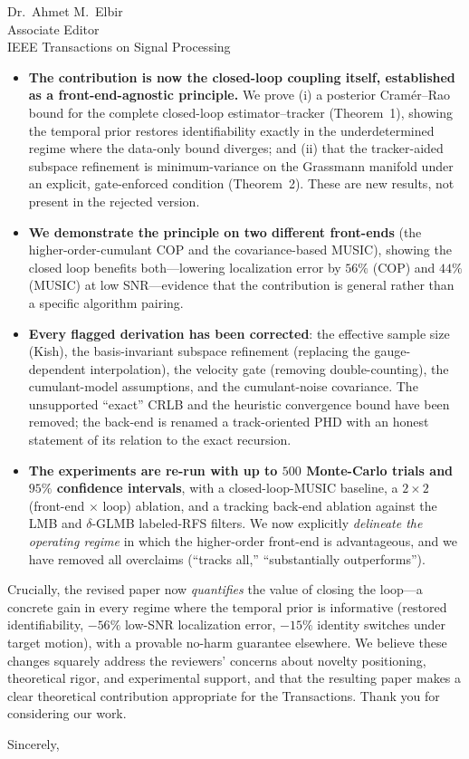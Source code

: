 \documentclass[11pt]{letter}
\begin{document}
\begin{letter}{Dr.\ Ahmet M.\ Elbir \\ Associate Editor \\ IEEE Transactions on Signal Processing}
\begin{itemize}
\item \textbf{The contribution is now the closed-loop coupling itself,
  established as a front-end-agnostic principle.} We prove (i) a posterior
  Cram\'er--Rao bound for the complete closed-loop estimator--tracker
  (Theorem~1), showing the temporal prior restores identifiability exactly in
  the underdetermined regime where the data-only bound diverges; and (ii) that
  the tracker-aided subspace refinement is minimum-variance on the Grassmann
  manifold under an explicit, gate-enforced condition (Theorem~2). These are new
  results, not present in the rejected version.
\item \textbf{We demonstrate the principle on two different front-ends} (the
  higher-order-cumulant COP and the covariance-based MUSIC), showing the closed
  loop benefits both---lowering localization error by $56\%$ (COP) and $44\%$
  (MUSIC) at low SNR---evidence that the contribution is general rather than a
  specific algorithm pairing.
\item \textbf{Every flagged derivation has been corrected}: the effective sample
  size (Kish), the basis-invariant subspace refinement (replacing the
  gauge-dependent interpolation), the velocity gate (removing double-counting),
  the cumulant-model assumptions, and the cumulant-noise covariance. The
  unsupported ``exact'' CRLB and the heuristic convergence bound have been
  removed; the back-end is renamed a track-oriented PHD with an honest statement
  of its relation to the exact recursion.
\item \textbf{The experiments are re-run with up to $500$ Monte-Carlo trials and
  $95\%$ confidence intervals}, with a closed-loop-MUSIC baseline, a
  $2\times2$ (front-end $\times$ loop) ablation, and a tracking back-end ablation
  against the LMB and $\delta$-GLMB labeled-RFS filters. We now explicitly \emph{delineate the operating regime}
  in which the higher-order front-end is advantageous, and we have removed all
  overclaims (``tracks all,'' ``substantially outperforms'').
\end{itemize}

Crucially, the revised paper now \emph{quantifies} the value of closing the
loop---a concrete gain in every regime where the temporal prior is informative
(restored identifiability, $-56\%$ low-SNR localization error, $-15\%$ identity
switches under target motion), with a provable no-harm guarantee elsewhere.
We believe these changes squarely address the reviewers' concerns about novelty
positioning, theoretical rigor, and experimental support, and that the resulting
paper makes a clear theoretical contribution appropriate for the Transactions.
Thank you for considering our work.

\closing{Sincerely,}
\end{letter}
\end{document}
